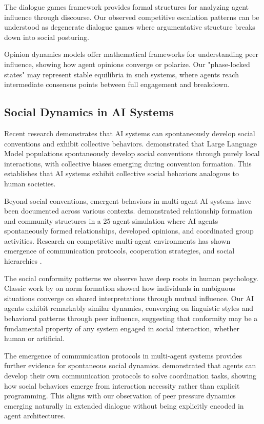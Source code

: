 \documentclass[11pt,letterpaper]{article}
\begin{document}
The dialogue games framework \citep{mcburney2002dialogue} provides formal structures for analyzing agent influence through discourse. Our observed competitive escalation patterns can be understood as degenerate dialogue games where argumentative structure breaks down into social posturing.

Opinion dynamics models \citep{hegselmann2002opinion} offer mathematical frameworks for understanding peer influence, showing how agent opinions converge or polarize. Our "phase-locked states" may represent stable equilibria in such systems, where agents reach intermediate consensus points between full engagement and breakdown.

\subsection{Social Dynamics in AI Systems}

Recent research demonstrates that AI systems can spontaneously develop social conventions and exhibit collective behaviors. \citet{ashery2025emergent} demonstrated that Large Language Model populations spontaneously develop social conventions through purely local interactions, with collective biases emerging during convention formation. This establishes that AI systems exhibit collective social behaviors analogous to human societies.

Beyond social conventions, emergent behaviors in multi-agent AI systems have been documented across various contexts. \citet{park2023generative} demonstrated relationship formation and community structures in a 25-agent simulation where AI agents spontaneously formed relationships, developed opinions, and coordinated group activities. Research on competitive multi-agent environments has shown emergence of communication protocols, cooperation strategies, and social hierarchies \citep{liang2020emergent,lu2023adversarial}.

The social conformity patterns we observe have deep roots in human psychology. Classic work by \citet{sherif1936psychology} on norm formation showed how individuals in ambiguous situations converge on shared interpretations through mutual influence. Our AI agents exhibit remarkably similar dynamics, converging on linguistic styles and behavioral patterns through peer influence, suggesting that conformity may be a fundamental property of any system engaged in social interaction, whether human or artificial.

The emergence of communication protocols in multi-agent systems provides further evidence for spontaneous social dynamics. \citet{foerster2016learning} demonstrated that agents can develop their own communication protocols to solve coordination tasks, showing how social behaviors emerge from interaction necessity rather than explicit programming. This aligns with our observation of peer pressure dynamics emerging naturally in extended dialogue without being explicitly encoded in agent architectures.
\end{document}
